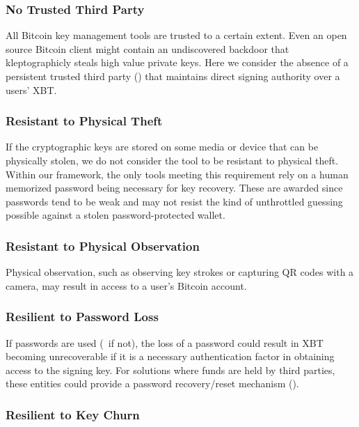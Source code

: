 \subsubsection{No Trusted Third Party}
\label{No Trusted Third Party}
All Bitcoin key management tools are trusted to a certain extent. Even an open source Bitcoin client might contain an undiscovered backdoor that kleptographicly steals high value private keys. Here we consider the absence of a persistent trusted third party (\full) that maintains direct signing authority over a users' XBT. 

\subsubsection{Resistant to Physical Theft}
\label{Resistant to Physical Theft}
If the cryptographic keys are stored on some media or device that can be physically stolen, we do not consider the tool to be resistant to physical theft. Within our framework, the only tools meeting this requirement rely on a human memorized password being necessary for key recovery. These are awarded \prt since passwords tend to be weak and may not resist the kind of unthrottled guessing possible against a stolen password-protected wallet. 

\subsubsection{Resistant to Physical Observation}
\label{Resistant to Physical Observation}
Physical observation, such as observing key strokes or capturing QR codes with a camera, may result in access to a user's Bitcoin account. 

\subsubsection{Resilient to Password Loss}
\label{Resilient to Password Loss}
If passwords are used (\full~if not), the loss of a password could result in XBT becoming unrecoverable if it is a necessary authentication factor in obtaining access to the signing key. For solutions where funds are held by third parties, these entities could provide a password recovery/reset mechanism (\full).

\subsubsection{Resilient to Key Churn}
\label{Compatible with Change Keys}

